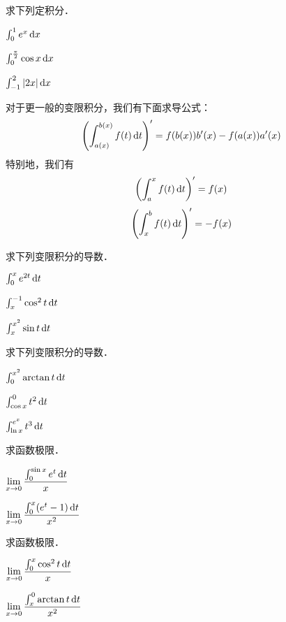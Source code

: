 \documentclass[14pt,notheorems,leqno,xcolor={rgb}]{beamer} %
\begin{document}
\begin{frame}
\begin{exercise}求下列定积分．
\begin{enumlite}
\item $\int_0^1 e^x \mathop{}\!\mathrm{d} x$
\item $\int_0^{\frac\pi2} \cos x \mathop{}\!\mathrm{d} x$
\item $\int_{-1}^2 |2x|\mathop{}\!\mathrm{d} x$
\end{enumlite}
\end{exercise}
\end{frame}

\begin{frame}
\begin{theorem}对于更一般的变限积分，我们有下面求导公式：
\[ \left(\int_{a(x)}^{b(x)} f(t)\mathop{}\!\mathrm{d} t\right)'=f(b(x))b'(x)-f(a(x))a'(x) \]
特别地，我们有
\[ \left(\int_a^x f(t)\mathop{}\!\mathrm{d} t\right)'=f(x) \]
\[ \left(\int_x^b f(t)\mathop{}\!\mathrm{d} t\right)'=-f(x) \]
\end{theorem}
\end{frame}

\begin{frame}
\begin{example}求下列变限积分的导数．
\begin{enumlite}
\item $\int_0^x e^{2t}\mathop{}\!\mathrm{d} t$
\item $\int_x^{-1} \cos^2t\mathop{}\!\mathrm{d} t$
\item $\int_x^{x^2}\sin t\mathop{}\!\mathrm{d} t$
\end{enumlite}
\end{example}\pause
\begin{exercise}求下列变限积分的导数．
\begin{enumlite}
\item $\int_0^{x^2} \arctan t \mathop{}\!\mathrm{d} t$
\item $\int_{\cos x}^{0} t^2\mathop{}\!\mathrm{d} t$\pause
\item $\int_{\ln x}^{e^x}t^3\mathop{}\!\mathrm{d} t$
\end{enumlite}
\end{exercise}
\end{frame}

\begin{frame}
\begin{example}求函数极限．
\begin{enumlite}
\item $\displaystyle \lim_{x\to0}\frac{\int_0^{\sin x}e^t\mathop{}\!\mathrm{d} t}{x}$
\item $\displaystyle \lim_{x\to0}\frac{\int_0^x(e^t-1)\mathop{}\!\mathrm{d} t}{x^2}$
\end{enumlite}
\end{example}\pause
\begin{exercise}求函数极限．
\begin{enumlite}
\item $\displaystyle \lim_{x\to0}\frac{\int_0^x\cos^2t\mathop{}\!\mathrm{d} t}{x}$\pause
\item $\displaystyle \lim_{x\to0}\frac{\int_x^0\arctan t\mathop{}\!\mathrm{d} t}{x^2}$
\end{enumlite}
\end{exercise}
\end{frame}
\end{document}
